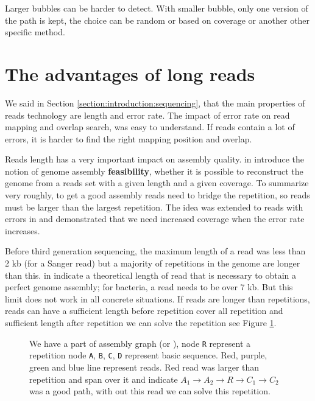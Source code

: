 \documentclass[main]{subfiles}
\begin{document}
Larger bubbles can be harder to detect. With smaller bubble, only one version of the path is kept, the choice can be random or based on coverage or another other specific method.

\section{The advantages of long reads}

We said in Section \ref{section:introduction:sequencing}, that the main properties of reads technology are length and error rate. The impact of error rate on read mapping and overlap search, was easy to understand. If reads contain a lot of errors, it is harder to find the right mapping position and overlap.

Reads length has a very important impact on assembly quality. \citeauthor{Bresler_Tse} in \cite{Bresler_Tse} introduce the notion of genome assembly \textbf{feasibility}, whether it is possible to reconstruct the genome from a reads set with a given length and a given coverage. To summarize very roughly, to get a good assembly reads need to bridge the repetition, so reads must be larger than the largest repetition. The idea was extended to reads with errors in \cite{feasibility_with_error} and demonstrated that we need increased coverage when the error rate increases.

Before third generation sequencing, the maximum length of a read was less than 2 kb (for a Sanger read) but a majority of repetitions in the genome are longer than this. \citeauthor{one_chromosome_one_contig} in \cite{one_chromosome_one_contig} indicate a theoretical length of read that is necessary to obtain a perfect genome assembly; for bacteria, a read needs to be over 7 kb. But this limit does not work in all concrete situations. If reads are longer than repetitions, reads can have a sufficient length before repetition cover all repetition and sufficient length after repetition we can solve the repetition see Figure \ref{intro:fig:whylongreads}.

\begin{figure}[ht]
    \centering
    
    \caption{We have a part of assembly graph (\OLC or \DBG), node \texttt{R} represent a repetition node \texttt{A}, \texttt{B}, \texttt{C}, \texttt{D} represent basic sequence. Red, purple, green and blue line represent reads. Red read was larger than repetition and span over it and indicate $A_1 \rightarrow A_2 \rightarrow R \rightarrow C_1 \rightarrow C_2$ was a good path, with out this read we can solve this repetition.}
    \label{intro:fig:whylongreads}
\end{figure}
\end{document}

